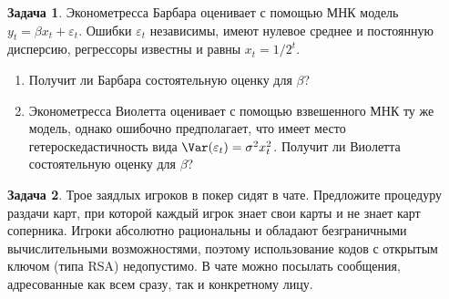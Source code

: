 \documentclass[11pt]{article}
\theoremstyle{definition} %
\newtheorem{zadacha}{Задача}
\begin{document}
\begin{zadacha}
Эконометресса Барбара оценивает с помощью МНК модель $y_t=\beta x_t+\varepsilon_t$. Ошибки $\varepsilon_t$ независимы, имеют нулевое среднее и постоянную дисперсию, регрессоры известны и равны $x_t=1/2^t$. 
\begin{enumerate}
\item Получит ли Барбара состоятельную оценку для $\beta$?
\item Эконометресса Виолетта оценивает с помощью взвешенного МНК ту же модель, однако ошибочно предполагает, что имеет место гетероскедастичность вида $\Var(\varepsilon_t)=\sigma^2 x_t^2$. Получит ли Виолетта состоятельную оценку для $\beta$?
\end{enumerate}
\end{zadacha}

\begin{zadacha}
Трое заядлых игроков в покер сидят в чате. Предложите процедуру раздачи карт, при которой каждый игрок знает свои карты и не знает карт соперника. Игроки абсолютно рациональны и обладают безграничными вычислительными возможностями, поэтому использование кодов с открытым ключом (типа RSA) недопустимо. В чате можно посылать сообщения, адресованные как всем сразу, так и конкретному лицу.
\end{zadacha}


\printbibliography
\end{document}
